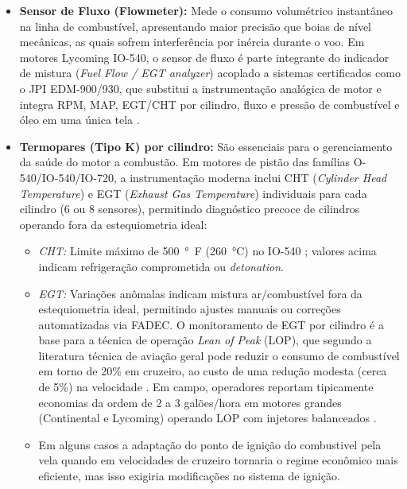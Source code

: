 \documentclass[a4paper,12pt]{article}
\begin{document}
\begin{itemize}
    \item \textbf{Sensor de Fluxo (Flowmeter):} Mede o consumo volumétrico instantâneo na linha de combustível, apresentando maior precisão que boias de nível mecânicas, as quais sofrem interferência por inércia durante o voo. Em motores Lycoming IO-540, o sensor de fluxo é parte integrante do indicador de mistura (\textit{Fuel Flow / EGT analyzer}) acoplado a sistemas certificados como o JPI EDM-900/930, que substitui a instrumentação analógica de motor e integra RPM, MAP, EGT/CHT por cilindro, fluxo e pressão de combustível e óleo em uma única tela \cite{jpi_edm900, jpi_edm930_manual}.
    
    \item \textbf{Termopares (Tipo K) por cilindro:} São essenciais para o gerenciamento da saúde do motor a combustão. Em motores de pistão das famílias O-540/IO-540/IO-720, a instrumentação moderna inclui CHT (\textit{Cylinder Head Temperature}) e EGT (\textit{Exhaust Gas Temperature}) individuais para cada cilindro (6 ou 8 sensores), permitindo diagnóstico precoce de cilindros operando fora da estequiometria ideal:
    \begin{itemize}
        \item \textit{CHT:} Limite máximo de \SI{500}{\degree F} (\SI{260}{\degreeCelsius}) no IO-540 \cite{lycomingmanual}; valores acima indicam refrigeração comprometida ou \textit{detonation}.
        \item \textit{EGT:} Variações anômalas indicam mistura ar/combustível fora da estequiometria ideal, permitindo ajustes manuais ou correções automatizadas via FADEC. O monitoramento de EGT por cilindro é a base para a técnica de operação \textit{Lean of Peak} (LOP), que segundo a literatura técnica de aviação geral pode reduzir o consumo de combustível em torno de 20\% em cruzeiro, ao custo de uma redução modesta (cerca de 5\%) na velocidade \cite{aopa_lop}. Em campo, operadores reportam tipicamente economias da ordem de 2 a 3 galões/hora em motores grandes (Continental e Lycoming) operando LOP com injetores balanceados \cite{aviation_consumer_gami}.
        \item Em alguns casos a adaptação do ponto de ignição do combustivel pela vela quando em velocidades de cruzeiro tornaria o regime econômico mais eficiente, mas isso exigiria modificações no sistema de ignição.
    \end{itemize}
\end{itemize}
\end{document}
